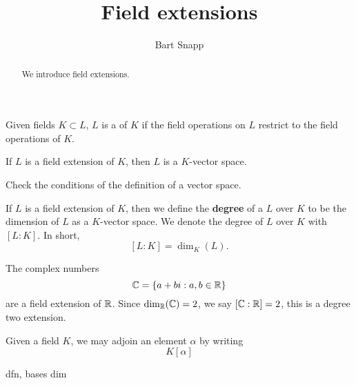 \documentclass{ximera}
\author{Bart Snapp}
\title{Field extensions}
\begin{document}
\begin{abstract}
  We introduce field extensions.
\end{abstract}
\maketitle








\begin{definition}
  Given fields $K\subset L$, $L$ is a  of $K$ if
  the field operations on $L$ restrict to the field operations of $K$.
\end{definition}

\begin{lemma}
  If $L$ is a field extension of $K$, then $L$ is a $K$-vector space.
  \begin{sketch}
    Check the conditions of the definition of a vector space.
  \end{sketch}
\end{lemma}

\begin{definition}
  If $L$ is a field extension of $K$, then we define the
  \textbf{degree} of a $L$ over $K$ to be the dimension of $L$ as a
  $K$-vector space. We denote the degree of $L$ over $K$ with
  $[L:K]$. In short,
  \[
  [L:K] = \dim_K(L).
  \]
\end{definition}

\begin{example}
  The complex numbers
  \[
  \mathbb C = \{a+bi:a,b\in\mathbb R\}
  \]
  are a field extension of $\mathbb R$. Since $\dim_\mathbb R(\mathbb C)=2$, we say
  $[\mathbb C:\mathbb R]=2$, this is a degree two extension.
\end{example}


\begin{example}
  Given a field $K$, we may adjoin an element $\alpha$ by writing
  \[
  K[\alpha]
  \]
\end{example}



dfn, bases dim
\end{document}
